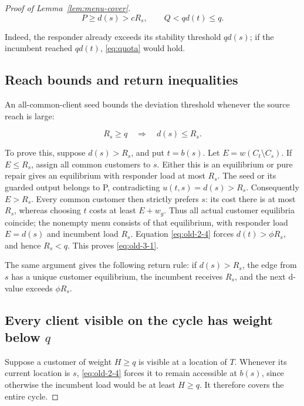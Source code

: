 \documentclass[11pt]{amsart}
\numberwithin{equation}{section}
\theoremstyle{definition}
\begin{document}
\begin{proof}[Proof of Lemma~\ref{lem:menu-cover}]
\begin{equation}
P\ge d(s)>cR_s,\qquad Q<qd(t)\le q. \label{eq:old-2-4}
\end{equation}

Indeed, the responder already exceeds its stability threshold \(qd(s)\); if the incumbent reached \(qd(t)\), \eqref{eq:quota} would hold.


\subsection{Reach bounds and return inequalities}\label{a-useful-bound-on-d}
An all-common-client seed bounds the deviation threshold whenever the source reach is large:


\begin{equation}
R_s\ge q\quad\Longrightarrow\quad d(s)\le R_s. \label{eq:old-3-1}
\end{equation}

To prove this, suppose \(d(s)>R_s\), and put \(t=b(s)\). Let \(E=w(C_t\setminus C_s)\). If \(E\le R_s\), assign all common customers to \(s\). Either this is an equilibrium or pure repair gives an equilibrium with responder load at most \(R_s\). The seed or its guarded output belongs to P, contradicting \(u(t,s)=d(s)>R_s\). Consequently \(E>R_s\). Every common customer then strictly prefers \(s\): its cost there is at most \(R_s\), whereas choosing \(t\) costs at least \(E+w_g\). Thus all actual customer equilibria coincide; the nonempty menu consists of that equilibrium, with responder load \(E=d(s)\) and incumbent load \(R_s\). Equation \eqref{eq:old-2-4} forces \(d(t)>\phi R_s\), and hence \(R_s<q\). This proves \eqref{eq:old-3-1}.

The same argument gives the following return rule: if \(d(s)>R_s\), the edge from \(s\) has a unique customer equilibrium, the incumbent receives \(R_s\), and the next d-value exceeds \(\phi R_s\).


\subsection{Every client visible on the cycle has weight below \texorpdfstring{$q$}{q}}\label{no-visible-customer-has-weight-at-least-q}

Suppose a customer of weight \(H\ge q\) is visible at a location of \(T\). Whenever its current location is \(s\), \eqref{eq:old-2-4} forces it to remain accessible at \(b(s)\), since otherwise the incumbent load would be at least \(H\ge q\). It therefore covers the entire cycle.


\end{proof}
\end{document}
